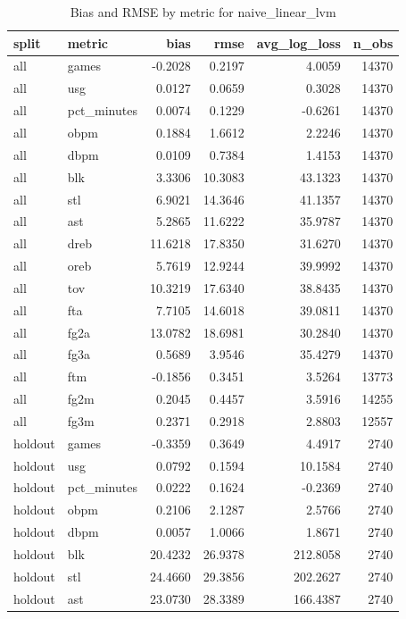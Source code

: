 \begin{table}
\caption{Bias and RMSE by metric for naive_linear_lvm}
\label{tab:naive_linear_lvm_bias_rmse}
\begin{tabular}{llrrrr}
\toprule
split & metric & bias & rmse & avg\_log\_loss & n\_obs \\
\midrule
all & games & -0.2028 & 0.2197 & 4.0059 & 14370 \\
all & usg & 0.0127 & 0.0659 & 0.3028 & 14370 \\
all & pct\_minutes & 0.0074 & 0.1229 & -0.6261 & 14370 \\
all & obpm & 0.1884 & 1.6612 & 2.2246 & 14370 \\
all & dbpm & 0.0109 & 0.7384 & 1.4153 & 14370 \\
all & blk & 3.3306 & 10.3083 & 43.1323 & 14370 \\
all & stl & 6.9021 & 14.3646 & 41.1357 & 14370 \\
all & ast & 5.2865 & 11.6222 & 35.9787 & 14370 \\
all & dreb & 11.6218 & 17.8350 & 31.6270 & 14370 \\
all & oreb & 5.7619 & 12.9244 & 39.9992 & 14370 \\
all & tov & 10.3219 & 17.6340 & 38.8435 & 14370 \\
all & fta & 7.7105 & 14.6018 & 39.0811 & 14370 \\
all & fg2a & 13.0782 & 18.6981 & 30.2840 & 14370 \\
all & fg3a & 0.5689 & 3.9546 & 35.4279 & 14370 \\
all & ftm & -0.1856 & 0.3451 & 3.5264 & 13773 \\
all & fg2m & 0.2045 & 0.4457 & 3.5916 & 14255 \\
all & fg3m & 0.2371 & 0.2918 & 2.8803 & 12557 \\
holdout & games & -0.3359 & 0.3649 & 4.4917 & 2740 \\
holdout & usg & 0.0792 & 0.1594 & 10.1584 & 2740 \\
holdout & pct\_minutes & 0.0222 & 0.1624 & -0.2369 & 2740 \\
holdout & obpm & 0.2106 & 2.1287 & 2.5766 & 2740 \\
holdout & dbpm & 0.0057 & 1.0066 & 1.8671 & 2740 \\
holdout & blk & 20.4232 & 26.9378 & 212.8058 & 2740 \\
holdout & stl & 24.4660 & 29.3856 & 202.2627 & 2740 \\
holdout & ast & 23.0730 & 28.3389 & 166.4387 & 2740 \\

\end{tabular}
\end{table}
